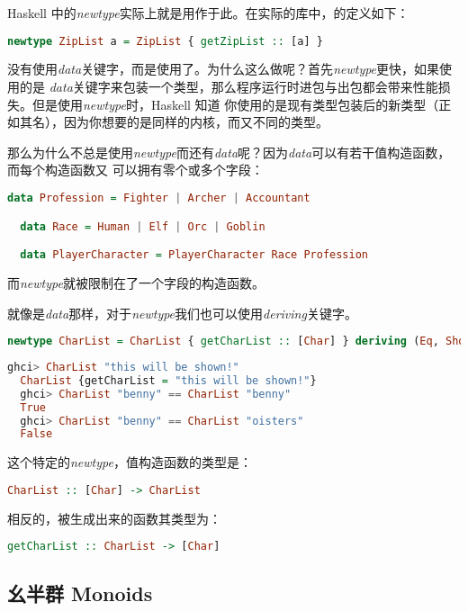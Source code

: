 \documentclass[./main.tex]{subfiles}
\begin{document}
Haskell 中的\textit{newtype}实际上就是用作于此。在实际的库中，的定义如下：

\begin{lstlisting}[language=Haskell]
  newtype ZipList a = ZipList { getZipList :: [a] }
\end{lstlisting}

没有使用\textit{data}关键字，而是使用了。为什么这么做呢？首先\textit{newtype}更快，如果使用的是
\textit{data}关键字来包装一个类型，那么程序运行时进包与出包都会带来性能损失。但是使用\textit{newtype}时，Haskell 知道
你使用的是现有类型包装后的新类型（正如其名），因为你想要的是同样的内核，而又不同的类型。

那么为什么不总是使用\textit{newtype}而还有\textit{data}呢？因为\textit{data}可以有若干值构造函数，而每个构造函数又
可以拥有零个或多个字段：

\begin{lstlisting}[language=Haskell]
  data Profession = Fighter | Archer | Accountant

  data Race = Human | Elf | Orc | Goblin

  data PlayerCharacter = PlayerCharacter Race Profession
\end{lstlisting}

而\textit{newtype}就被限制在了一个字段的构造函数。

就像是\textit{data}那样，对于\textit{newtype}我们也可以使用\textit{deriving}关键字。

\begin{lstlisting}[language=Haskell]
  newtype CharList = CharList { getCharList :: [Char] } deriving (Eq, Show)
\end{lstlisting}

\begin{lstlisting}[language=Haskell]
  ghci> CharList "this will be shown!"
  CharList {getCharList = "this will be shown!"}
  ghci> CharList "benny" == CharList "benny"
  True
  ghci> CharList "benny" == CharList "oisters"
  False
\end{lstlisting}

这个特定的\textit{newtype}，值构造函数的类型是：

\begin{lstlisting}[language=Haskell]
  CharList :: [Char] -> CharList
\end{lstlisting}

相反的，被生成出来的函数其类型为：

\begin{lstlisting}[language=Haskell]
  getCharList :: CharList -> [Char]
\end{lstlisting}




\subsection*{幺半群 Monoids}

\end{document}
